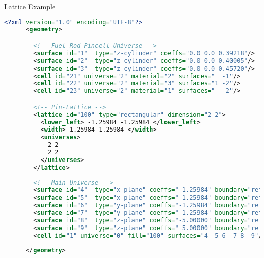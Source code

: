 \begin{frame}[fragile]{Lattice Example}


  \begin{scriptsize}
    \begin{lstlisting}[language=XML,gobble=4]
      <?xml version="1.0" encoding="UTF-8"?>
      <geometry>

        <!-- Fuel Rod Pincell Universe -->
        <surface id="1"  type="z-cylinder" coeffs="0.0 0.0 0.39218"/>     <!-- fuel OR   -->
        <surface id="2"  type="z-cylinder" coeffs="0.0 0.0 0.40005"/>     <!-- gap OR    -->
        <surface id="3"  type="z-cylinder" coeffs="0.0 0.0 0.45720"/>     <!-- clad OR   -->
        <cell id="21" universe="2" material="2" surfaces="  -1"/>         <!-- fuel  -->
        <cell id="22" universe="2" material="3" surfaces="1 -2"/>         <!-- clad  -->
        <cell id="23" universe="2" material="1" surfaces="   2"/>         <!-- water -->

        <!-- Pin-Lattice -->
        <lattice id="100" type="rectangular" dimension="2 2">
          <lower_left> -1.25984 -1.25984 </lower_left>
          <width> 1.25984 1.25984 </width>
          <universes>
            2 2
            2 2
          </universes>
        </lattice>
        
        <!-- Main Universe -->
        <surface id="4"  type="x-plane" coeffs="-1.25984" boundary="reflective"/>
        <surface id="5"  type="x-plane" coeffs=" 1.25984" boundary="reflective"/>
        <surface id="6"  type="y-plane" coeffs="-1.25984" boundary="reflective"/>
        <surface id="7"  type="y-plane" coeffs=" 1.25984" boundary="reflective"/>
        <surface id="8"  type="z-plane" coeffs="-5.00000" boundary="reflective"/>
        <surface id="9"  type="z-plane" coeffs=" 5.00000" boundary="reflective"/>
        <cell id="1" universe="0" fill="100" surfaces="4 -5 6 -7 8 -9"/>
        
      </geometry>
    \end{lstlisting}
  \end{scriptsize}


\end{frame}
